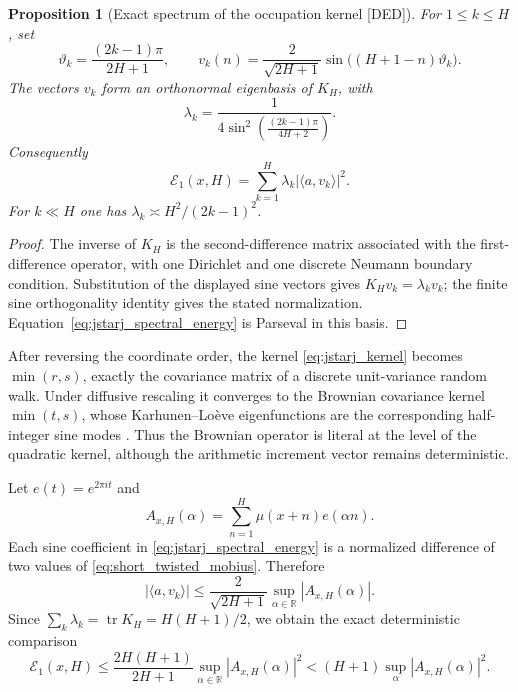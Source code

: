\documentclass[11pt]{amsart}
\numberwithin{equation}{section}
\theoremstyle{plain}
\newtheorem{proposition}[theorem]{Proposition}
\theoremstyle{definition}
\theoremstyle{remark}
\newcommand{\Mob}{\mu}
\begin{document}
\begin{proposition}[Exact spectrum of the occupation kernel
\textnormal{[DED]}]
\label{prop:jstarj_spectrum}
For $1\leq k\leq H$, set
\begin{equation}
 \vartheta_k=\frac{(2k-1)\pi}{2H+1},
 \qquad
 v_k(n)=\frac{2}{\sqrt{2H+1}}
 \sin\bigl((H+1-n)\vartheta_k\bigr).
\end{equation}
The vectors $v_k$ form an orthonormal eigenbasis of $K_H$, with
\begin{equation}
 \boxed{\;
 \lambda_k=
 \frac{1}{4\sin^2\!\left(\frac{(2k-1)\pi}{4H+2}\right)}.\;}
\label{eq:jstarj_eigenvalues}
\end{equation}
Consequently
\begin{equation}
 \boxed{\;
 \mathcal E_1(x,H)
 =\sum_{k=1}^{H}\lambda_k|\langle a,v_k\rangle|^2.\;}
\label{eq:jstarj_spectral_energy}
\end{equation}
For $k\ll H$ one has
$\lambda_k\asymp H^2/(2k-1)^2$.
\end{proposition}

\begin{proof}
The inverse of $K_H$ is the second-difference matrix associated with the
first-difference operator, with one Dirichlet and one discrete Neumann
boundary condition.  Substitution of the displayed sine vectors gives
$K_Hv_k=\lambda_kv_k$; the finite sine orthogonality identity gives the stated
normalization.  Equation~\eqref{eq:jstarj_spectral_energy} is Parseval in this
basis.
\end{proof}

After reversing the coordinate order, the kernel
\eqref{eq:jstarj_kernel} becomes $\min(r,s)$, exactly the covariance matrix of
a discrete unit-variance random walk.  Under diffusive rescaling it converges
to the Brownian covariance kernel $\min(t,s)$, whose Karhunen--Lo\`eve
eigenfunctions are the corresponding half-integer sine modes
\cite{Hackmann2016}.  Thus the Brownian operator is literal at the level of
the quadratic kernel, although the arithmetic increment vector remains
deterministic.

Let $e(t)=e^{2\pi i t}$ and
\begin{equation}
 A_{x,H}(\alpha)=\sum_{n=1}^{H}\Mob(x+n)e(\alpha n).
\label{eq:short_twisted_mobius}
\end{equation}
Each sine coefficient in \eqref{eq:jstarj_spectral_energy} is a normalized
difference of two values of \eqref{eq:short_twisted_mobius}.  Therefore
\begin{equation}
 |\langle a,v_k\rangle|
 \leq\frac{2}{\sqrt{2H+1}}
 \sup_{\alpha\in\mathbb R}|A_{x,H}(\alpha)|.
\end{equation}
Since $\sum_k\lambda_k=\operatorname{tr}K_H=H(H+1)/2$, we obtain the exact
deterministic comparison
\begin{equation}
 \boxed{\;
 \mathcal E_1(x,H)
 \leq\frac{2H(H+1)}{2H+1}
 \sup_{\alpha\in\mathbb R}|A_{x,H}(\alpha)|^2
 <(H+1)\sup_\alpha|A_{x,H}(\alpha)|^2.\;}
\label{eq:energy_twist_supremum}
\end{equation}
\end{document}
